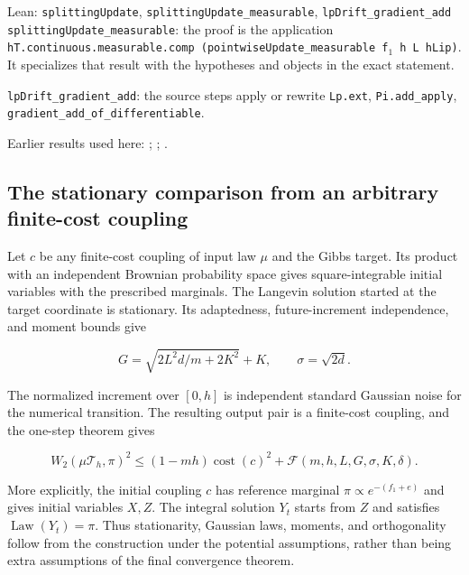 \documentclass[11pt,a4paper]{report}
\begin{document}
\begin{leanbox}{Lean: \texttt{splittingUpdate}, \texttt{splittingUpdate\_\allowbreak{}measurable}, \texttt{lpDrift\_\allowbreak{}gradient\_\allowbreak{}add}}
\texttt{splitting\allowbreak{}Update\_\allowbreak{}measurable}: the proof is the application \texttt{h\allowbreak{}T.\allowbreak{}continuous.\allowbreak{}measurable.\allowbreak{}comp (pointwise\allowbreak{}Update\_\allowbreak{}measurable f\ensuremath{{}_{1}} h L h\allowbreak{}Lip)}. It specializes that result with the hypotheses and objects in the exact statement.



\texttt{lp\allowbreak{}Drift\_\allowbreak{}gradient\_\allowbreak{}add}: the source steps apply or rewrite \texttt{Lp.\allowbreak{}ext}, \texttt{Pi.\allowbreak{}add\_\allowbreak{}apply}, \texttt{gradient\_\allowbreak{}add\_\allowbreak{}of\_\allowbreak{}differentiable}.
\end{leanbox}


Earlier results used here: \cite[Section~3.13.2]{LangevinLean2026ULASC}; \cite[Section~3.13.3]{LangevinLean2026ULASC}; \cite[Section~3.23.2]{LangevinLean2026ULASC}.
\subsection{\texorpdfstring{The stationary comparison from an arbitrary finite-cost coupling}{The stationary comparison from an arbitrary finite-cost coupling}}
\label{report-step-ProximalLangevin-SplittingCanonical-lean-2}


Let \(c\) be any finite-cost coupling of input law \(\mu\) and the Gibbs target. Its product with an independent Brownian probability space gives square-integrable initial variables with the prescribed marginals. The Langevin solution started at the target coordinate is stationary. Its adaptedness, future-increment independence, and moment bounds give

\[G=\sqrt{2L^2d/m+2K^2}+K,\qquad\sigma=\sqrt{2d}.\]

The normalized increment over \([0,h]\) is independent standard Gaussian noise for the numerical transition. The resulting output pair is a finite-cost coupling, and the one-step theorem gives

\[W_2(\mu\mathcal T_h,\pi)^2\le(1-mh)\operatorname{cost}(c)^2+\mathcal F(m,h,L,G,\sigma,K,\delta).\]

More explicitly, the initial coupling \(c\) has reference marginal \(\pi\propto e^{-(f_1+e)}\) and gives initial variables \(X,Z\). The integral solution \(Y_t\) starts from \(Z\) and satisfies \(\operatorname{Law}(Y_t)=\pi\). Thus stationarity, Gaussian laws, moments, and orthogonality follow from the construction under the potential assumptions, rather than being extra assumptions of the final convergence theorem.
\end{document}
